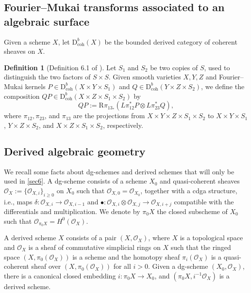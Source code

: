 \documentclass{amsart}
\numberwithin{equation}{section}
\newcommand\mc{\mathcal}
\newcommand{\D}{\mathrm{D}}
\theoremstyle{definition}
\newtheorem{definition}[theorem]{Definition}
\theoremstyle{remark}
\begin{document}
\subsection{Fourier--Mukai transforms associated to an algebraic surface}
Given a scheme $X$, let $\D^{b}_{\mathrm{coh}}(X)$ be the bounded derived category of coherent sheaves on $X$.

\begin{definition}[Definition 6.1 of \cite{zhao2020categorical}]
  \label{FMS}
   Let $S_1$ and $S_2$ be two copies of $S$, used to distinguish the two factors of $S\times S$. Given smooth varieties $X,Y,Z$ and Fourier--Mukai kernels $P\in \D^{b}_{\mathrm{coh}}(X\times Y\times S_1)$ and $Q\in \D^{b}_{\mathrm{coh}}(Y\times Z\times S_{2})$, we define the composition $QP\in \D^{b}_{\mathrm{coh}}(X\times Z\times S_1\times S_2)$ by
$$QP:=\mathrm{R}\pi_{13_{*}}(L\pi_{12}^*P\otimes L\pi_{23}^*Q),$$
where $\pi_{12},\pi_{23}$, and $\pi_{13}$ are the projections from $X\times Y\times Z\times S_1\times S_2$ to $X\times Y\times S_1$, $Y\times Z\times S_2$, and $X\times Z\times S_1\times S_2$, respectively.
\end{definition}

\subsection{Derived algebraic geometry}
\label{sec5}
We recall some facts about dg-schemes and derived schemes that will only be used in \cref{sec6}.
A dg-scheme consists of a scheme $X_{0}$ and quasi-coherent sheaves $\mc{O}_{X}:=\{\mc{O}_{X,i}\}_{i\geq 0}$ on $X_{0}$ such that $\mc{O}_{X,0}=\mc{O}_{X_{0}}$, together with a cdga structure, i.e., maps $\delta:\mc{O}_{X,i}\to \mc{O}_{X,i-1}$ and $\bullet:\mc{O}_{X,i}\otimes \mc{O}_{X,j}\to \mc{O}_{X,i+j}$ compatible with the differentials and multiplication. We denote by $\pi_{0}X$ the closed subscheme of $X_{0}$ such that $\mc{O}_{\pi_{0}X}=H^{0}(\mc{O}_{X})$.

A derived scheme $X$ consists of a pair $(X,\mc{O}_{X})$, where $X$ is a topological space and $\mc{O}_{X}$ is a sheaf of commutative simplicial rings on $X$ such that the ringed space $(X,\pi_{0}(\mc{O}_{X}))$ is a scheme and the homotopy sheaf $\pi_{i}(\mc{O}_{X})$ is a quasi-coherent sheaf over $(X,\pi_{0}(\mc{O}_{X}))$ for all $i>0$. Given a dg-scheme $(X_{0}, \mc{O}_{X})$, there is a canonical closed embedding $i:\pi_{0}X\to X_{0}$, and $(\pi_{0}X,i^{-1}\mc{O}_{X})$ is a derived scheme.
\end{document}
